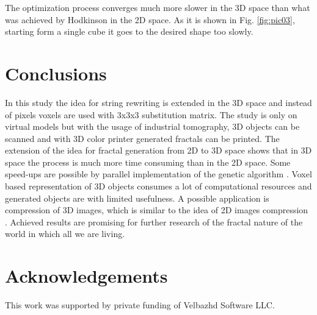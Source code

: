 \documentclass{llncs}
\begin{document}
The optimization process converges much more slower in the 3D space than what was achieved by Hodkinson in the 2D space. As it is shown in Fig. \ref{fig:pic03}, starting form a single cube it goes to the desired shape too slowly. 

\section{Conclusions} \label{Conclusions}

In this study the idea for string rewriting is extended in the 3D space and instead of pixels voxels are used with 3x3x3 substitution matrix. The study is only on virtual models but with the usage of industrial tomography, 3D objects can be scanned and with 3D color printer generated fractals can be printed. The extension of the idea for fractal generation from 2D to 3D space shows that in 3D space the process is much more time consuming than in the 2D space. Some speed-ups are possible by parallel implementation of the genetic algorithm \cite{shonkwiler02}. Voxel based representation of 3D objects consumes a lot of computational resources and generated objects are with limited usefulness. A possible application is compression of 3D images, which is similar to the idea of 2D images compression \cite{vences01,albundi01}. Achieved results are promising for further research of the fractal nature of the world in which all we are living. 

\section*{Acknowledgements}
This work was supported by private funding of Velbazhd Software LLC.
\end{document}
